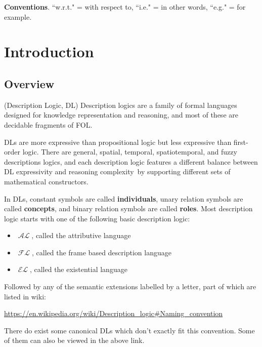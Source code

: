 \documentclass{article}
\DeclareMathOperator{\al}{\mathcal{AL}}
\DeclareMathOperator{\fl}{\mathcal{FL}}
\DeclareMathOperator{\el}{\mathcal{EL}}
\begin{document}
\textbf{Conventions}. ``w.r.t." = with respect to, ``i.e." = in other words, ``e.g." = for example.

\section{Introduction}
\subsection{Overview}
\begin{defin}(Description Logic, DL)\newline
Description logics are a family of formal languages designed for knowledge representation and reasoning, and most of these are decidable fragments of FOL.
\end{defin}
DLs are more expressive than propositional logic but less expressive than first-order logic.
There are general, spatial, temporal, spatiotemporal, and fuzzy descriptions logics, and each description logic features a different balance between DL expressivity and reasoning complexity by supporting different sets of mathematical constructors.\newline

In DLs, constant symbols are called \textbf{individuals}, unary relation symbols are called \textbf{concepts}, and binary relation symbols are called \textbf{roles}.
Most description logic starts with one of the following basic description logic:
\begin{itemize}
\item $\al$, called the attributive language
\item $\fl$, called the frame based description language
\item $\el$, called the existential language
\end{itemize}
Followed by any of the semantic extensions labelled by a letter, part of which are listed in wiki:\newline

{\url{https://en.wikipedia.org/wiki/Description_logic#Naming_convention}} \newline

There do exist some canonical DLs  which don't exactly fit this convention. Some of them can also be viewed in the above link.
\end{document}
